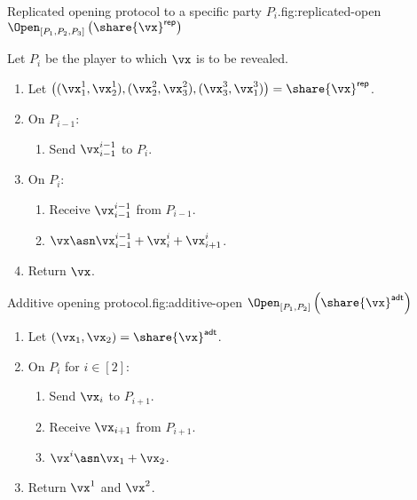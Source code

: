 \begin{Boxfig}{Replicated opening protocol to a specific party $P_i$.}{fig:replicated-open}
  {$\Open_{[P_1, P_2, P_3]} \left( \share{\vx}^{\mathsf{rep}} \right)$}

  Let $P_i$ be the player to which $\vx$ is to be revealed.

  \begin{enumerate}
  \item Let $\left( (\vx_1^1, \vx_2^1), (\vx_2^2, \vx_3^2), (\vx_3^3, \vx_1^3) \right) = \share{\vx}^{\mathsf{rep}}$.
  \item On $P_{i-1}$:
  \begin{enumerate}
    \item Send $\vx_{i-1}^{i-1}$ to $P_{i}$.
  \end{enumerate}
  \item On $P_i$:
  \begin{enumerate}
   \item Receive $\vx_{i-1}^{i-1}$ from $P_{i-1}$.
   \item $\vx \asn \vx_{i-1}^{i-1} + \vx_i^i + \vx_{i+1}^{i}$.
  \end{enumerate}
  \item Return $\vx$.
\end{enumerate}
\end{Boxfig}


\begin{Boxfig}{Additive opening protocol.}{fig:additive-open}
  {$\Open_{[P_1, P_2]} \left( \share{\vx}^{\mathsf{adt}} \right)$}
  \begin{enumerate}
  \item Let $(\vx_1, \vx_2) = \share{\vx}^{\mathsf{adt}}$.
  \item On $P_i$ for $i \in [2]$:
  \begin{enumerate}
    \item Send $\vx_i$ to $P_{i+1}$.
    \item Receive $\vx_{i+1}$ from $P_{i+1}$.
    \item $\vx^i \asn \vx_1 + \vx_2$.
  \end{enumerate}
  \item Return $\vx^1$ and $\vx^2$.
\end{enumerate}
\end{Boxfig}

